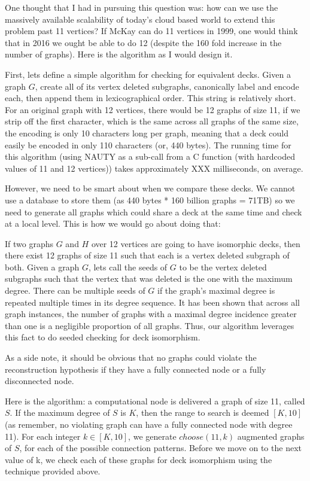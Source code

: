 One thought that I had in pursuing this question was: how can we use the massively available scalability of today's cloud based world to extend this problem past 11 vertices?
If McKay can do 11 vertices in 1999, one would think that in 2016 we ought be able to do 12 (despite the 160 fold increase in the number of graphs).
Here is the algorithm as I would design it.

First, lets define a simple algorithm for checking for equivalent decks.
Given a graph $G$, create all of its vertex deleted subgraphs, canonically label and encode each, then append them in lexicographical order.
This string is relatively short.
For an original graph with 12 vertices, there would be 12 graphs of size 11, if we strip off the first character, which is the same across all graphs of the same size, the encoding is only 10 characters long per graph, meaning that a deck could easily be encoded in only 110 characters (or, 440 bytes).
The running time for this algorithm (using NAUTY as a sub-call from a C function (with hardcoded values of 11 and 12 vertices)) takes approximately XXX milliseconds, on average.

However, we need to be smart about when we compare these decks.
We cannot use a database to store them (as 440 bytes * 160 billion graphs = 71TB)
so we need to generate all graphs which could share a deck at the same time and check at a local level.
This is how we would go about doing that:

If two graphs $G$ and $H$ over 12 vertices are going to have isomorphic decks, then there exist 12 graphs of size 11 such that each is a vertex deleted subgraph of both.
Given a graph $G$, lets call the seeds of $G$ to be the vertex deleted subgraphs such that the vertex that was deleted is the one with the maximum degree.
There can be multiple seeds of $G$ if the graph's maximal degree is repeated multiple times in its degree sequence.
It has been shown that across all graph instances, the number of graphs with a maximal degree incidence greater than one is a negligible proportion of all graphs.
Thus, our algorithm leverages this fact to do seeded checking for deck isomorphism.

As a side note, it should be obvious that no graphs could violate the reconstruction hypothesis if they have a fully connected node or a fully disconnected node.

Here is the algorithm: a computational node is delivered a graph of size 11, called $S$.
If the maximum degree of $S$ is $K$, then the range to search is deemed $[K, 10]$ (as remember, no violating graph can have a fully connected node with degree 11).
For each integer $k \in [K, 10]$, we generate $choose(11, k)$ augmented graphs of $S$, for each of the possible connection patterns.
Before we move on to the next value of k, we check each of these graphs for deck isomorphism using the technique provided above.

